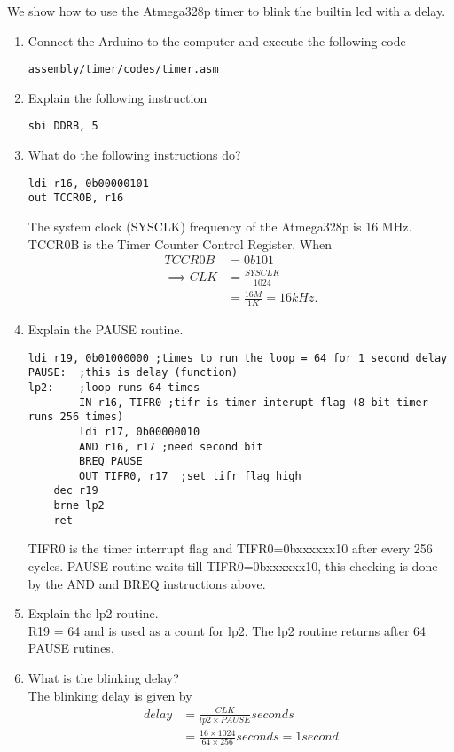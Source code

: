 We show how to use the Atmega328p timer to blink the builtin led with a delay.
\begin{enumerate}[label=\arabic*.,ref=\theenumi]
\item Connect the Arduino to the computer and execute the following code
\begin{lstlisting}
assembly/timer/codes/timer.asm
\end{lstlisting}

\item Explain the following instruction
\begin{lstlisting}
sbi DDRB, 5
\end{lstlisting}
\item What do the following instructions do?
\begin{lstlisting}
ldi r16, 0b00000101 
out TCCR0B, r16 
\end{lstlisting}
\solution The system clock (SYSCLK) frequency of the Atmega328p is 16 MHz.  TCCR0B is the Timer Counter Control Register.  When 
\begin{align}
TCCR0B&=0b101 \\
\implies CLK &= \frac{SYSCLK}{1024} \\
&= \frac{16M}{1K} = 16kHz.
\end{align}
\item Explain the PAUSE routine.
\begin{lstlisting}
ldi r19, 0b01000000 ;times to run the loop = 64 for 1 second delay
PAUSE:	;this is delay (function)
lp2:	;loop runs 64 times
		IN r16, TIFR0 ;tifr is timer interupt flag (8 bit timer runs 256 times)
		ldi r17, 0b00000010
		AND r16, r17 ;need second bit
		BREQ PAUSE 
		OUT TIFR0, r17	;set tifr flag high
	dec r19
	brne lp2
	ret
\end{lstlisting}
\solution TIFR0 is the timer interrupt flag and TIFR0=0bxxxxxx10 after every 256 cycles. PAUSE routine waits till TIFR0=0bxxxxxx10, this checking is done by the AND and BREQ instructions above.  
\item Explain the lp2 routine.
\\
\solution R19 = 64 and is used as a count for lp2. The lp2 routine returns after 64 PAUSE rutines.
\item What is the blinking delay?
\\
\solution The blinking delay is given by
\begin{align}
delay &= \frac{CLK}{lp2\times PAUSE} seconds
\\
& = \frac{16 \times 1024}{64 \times 256} seconds = 1 second
\end{align}
\end{enumerate}
%
